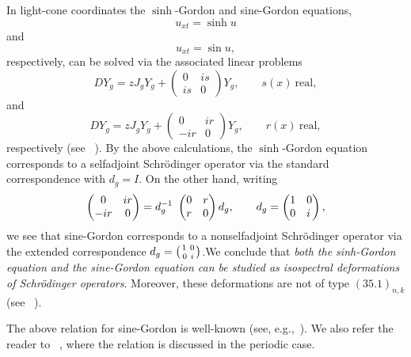\documentclass{surv-l}
\theoremstyle{plain}
\theoremstyle{definition}
\numberwithin{equation}{chapter}
\begin{document}
In light-cone coordinates the $\sinh$-Gordon and sine-Gordon equations,
\begin{equation*}
u_{xt}=\sinh u
\end{equation*}
and
\begin{equation*}
u_{xt}=\sin u,
\end{equation*}
respectively, can be solved via the associated linear problems
\begin{equation*}
DY_{g}=zJ_{g}Y_{g}+ \left(\begin{array}{ll}
0 & is\\
is & 0
\end{array}\right) Y_{g},\qquad s(x)\ \mathrm{real},
\end{equation*}
and
\begin{equation*}
DY_{g}=zJ_{g}Y_{g}+ \left(\begin{array}{cc}
0 & ir\\
-ir & 0
\end{array}\right) Y_{g},\qquad r(x)\ \mathrm{real},
\end{equation*}
respectively (see ~\cite{AKNS}). By the above calculations, the $\sinh$-Gordon equation corresponds to a selfadjoint Schr\"{o}dinger operator via the standard correspondence with $d_{g}=I$. On the other hand, writing
\begin{equation*}
\left(\begin{array}{@{}cc@{}}
0 & ir\\
-ir & 0
\end{array}\right)=d_{g}^{-1}\ \left(\begin{array}{@{}ll@{}}
0 & r\\
r & 0
\end{array}\right)d_{g},\qquad d_{g}=\left(\begin{array}{@{}ll@{}}
1 & 0\\
0 & i
\end{array}\right),
\end{equation*}
we see that sine-Gordon corresponds to a nonselfadjoint Schr\"{o}dinger operator via the extended correspondence $d_{g}=\left({1 \ 0\atop 0 \ i}\right)$.We conclude that \emph{both the sinh-Gordon equation and the sine-Gordon equation can be studied as isospectral deformations of Schr\"{o}dinger operators}. Moreover, these deformations are not of type $(35.1)_{n,k}$ (see ~\cite{AKNS}).

The above relation for sine-Gordon is well-known (see, e.g.,~\cite{La}). We also refer the reader to ~\cite{Fi}, where the relation is discussed in the periodic case.
\end{document}
